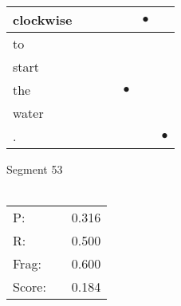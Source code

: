 \documentclass[landscape]{article}
\newcommand{\ssp}{\hspace{2pt}}
\newcommand{\mex}{\cellcolor{g}$\bullet$}
\begin{document}
\begin{tabular}{|l|p{10pt}|p{10pt}|p{10pt}|p{10pt}|p{10pt}|p{10pt}|}
\hline
\ssp \cellcolor{ref4}clockwise \ssp&\hspace{2pt}&\hspace{2pt}&\hspace{2pt}&\hspace{2pt}&\hspace{2pt}\mex&\hspace{2pt}\\
\hline
\ssp to \ssp&\hspace{2pt}&\hspace{2pt}&\hspace{2pt}&\hspace{2pt}&\hspace{2pt}&\hspace{2pt}\\
\hline
\ssp start \ssp&\hspace{2pt}&\hspace{2pt}&\hspace{2pt}&\hspace{2pt}&\hspace{2pt}&\hspace{2pt}\\
\hline
\ssp \cellcolor{ref3}the \ssp&\hspace{2pt}&\hspace{2pt}&\hspace{2pt}&\hspace{2pt}\mex&\hspace{2pt}&\hspace{2pt}\\
\hline
\ssp water \ssp&\hspace{2pt}&\hspace{2pt}&\hspace{2pt}&\hspace{2pt}&\hspace{2pt}&\hspace{2pt}\\
\hline
\ssp \cellcolor{ref5}. \ssp&\hspace{2pt}&\hspace{2pt}&\hspace{2pt}&\hspace{2pt}&\hspace{2pt}&\hspace{2pt}\mex\\
\hline
\end{tabular}

\vspace{6pt}
\noindent Segment 53\\\\
\noindent\begin{tabular}{lm{12pt}r}
\hline
P:&&0.316\\
R:&&0.500\\
Frag:&&0.600\\
Score:&&0.184\\
\end{tabular}
\end{document}
